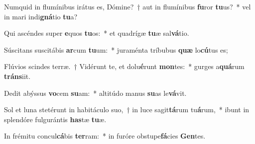 \item Numquid in flumínibus irátus es, Dómine?~† aut in flumínibus \textbf{fu}ror \textbf{tu}us?~* vel in mari indi\textbf{gná}tio \textbf{tu}a?
\item Qui ascéndes super \textbf{e}quos \textbf{tu}os:~* et quadrígæ \textbf{tu}æ sal\textbf{vá}tio.
\item Súscitans suscitábis \textbf{ar}cum \textbf{tu}um:~* juraménta tríbubus \textbf{quæ} lo\textbf{cú}tus es;
\item Flúvios scindes terræ.~† Vidérunt te, et dolu\textbf{é}runt \textbf{mon}tes:~* gurges a\textbf{quá}rum \textbf{tráns}iit.
\item Dedit abýssus \textbf{vo}cem \textbf{su}am:~* altitúdo manus \textbf{su}as le\textbf{vá}vit.
\item Sol et luna stetérunt in habitáculo suo,~† in luce sagit\textbf{tá}rum tu\textbf{á}rum,~* ibunt in splendóre fulgurántis \textbf{has}tæ \textbf{tu}æ.
\item In frémitu concul\textbf{cá}bis \textbf{ter}ram:~* in furóre obstupe\textbf{fá}cies \textbf{Gen}tes.
